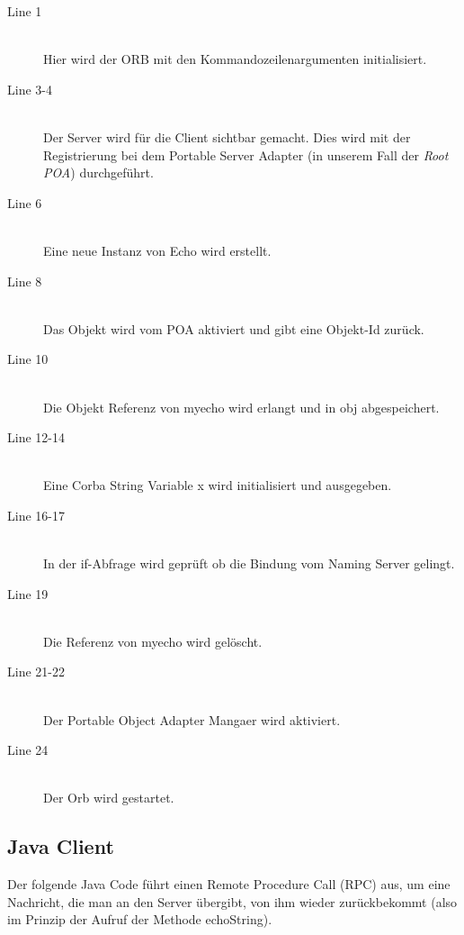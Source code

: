 \documentclass[11pt]{article}
\begin{document}
\begin{description}

\item[Line 1] \hfill \\
Hier wird der ORB mit den Kommandozeilenargumenten initialisiert.

\item[Line 3-4] \hfill \\
Der Server wird für die Client sichtbar gemacht. Dies wird mit der Registrierung bei dem Portable Server Adapter (in unserem Fall der \textit{Root POA}) durchgeführt.

\item[Line 6] \hfill \\
Eine neue Instanz von Echo wird erstellt.

\item[Line 8] \hfill \\
Das Objekt wird vom POA aktiviert und gibt eine Objekt-Id zurück.

\item[Line 10] \hfill \\
Die Objekt Referenz von myecho wird erlangt und in obj abgespeichert.

\item[Line 12-14] \hfill \\
Eine Corba String Variable x wird initialisiert und ausgegeben. 

\item[Line 16-17] \hfill \\
In der if-Abfrage wird geprüft ob die Bindung vom Naming Server gelingt.

\item[Line 19] \hfill \\
Die Referenz von myecho wird gelöscht.

\item[Line 21-22] \hfill \\
Der Portable Object Adapter Mangaer wird aktiviert.

\item[Line 24] \hfill \\
Der Orb wird gestartet.

\end{description}

\subsection{Java Client}

Der folgende Java Code führt einen Remote Procedure Call (RPC) aus, um eine Nachricht, die man an den Server übergibt, von ihm wieder zurückbekommt (also im Prinzip der Aufruf der Methode echoString).
\end{document}
